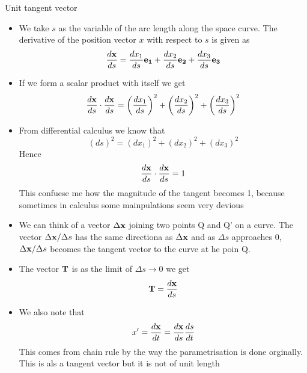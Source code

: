 	\begin{frame}{Unit tangent vector}
		\begin{itemize}
			\item We take $s$ as the variable of the arc length along the space curve. The derivative of the position vector $x$ with respect to $s$ is given as
			\begin{equation}
				\frac{d\mathbf{x}}{ds} = \frac{dx_1}{ds}\mathbf{e_1} +\frac{dx_2}{ds}\mathbf{e_2}+\frac{dx_3}{ds}\mathbf{e_3}
			\end{equation}
			\item If we form a scalar product with itself we get
			\begin{equation}
				\frac{d \mathbf{x}}{ds} \cdot \frac{d \mathbf{x}}{ds} = 
				\left(\frac{dx_1}{ds} \right)^2 + \left(\frac{dx_2}{ds} \right)^2 + \left(\frac{dx_3}{ds} \right)^2
			\end{equation}
			\item From differential calculus we know that
			\begin{equation}
				\left(ds \right)^2 = \left(dx_1 \right)^2 + \left(dx_2 \right)^2 + \left(dx_3 \right)^2
			\end{equation}
			Hence
			\begin{equation}
				\frac{d \mathbf{x}}{ds} \cdot \frac{d \mathbf{x}}{ds} =  1
			\end{equation}
			This confuese me how the magnitude of the tangent becomes 1, because sometimes in calculus some mainpulations seem very devious
		\end{itemize}
	\end{frame}


	\begin{frame}
		\begin{itemize}
			\item We can think of a vector $\Delta\mathbf{ x}$ joining two points Q and Q' on a curve. The vector $\Delta\mathbf{ x}/\Delta s$ has the same directiona as $\Delta\mathbf{ x}$ and as $\Delta s$ approaches 0, $\Delta\mathbf{ x}/\Delta s$ becomes the tangent vector to the curve at he poin Q. 
			\item The vector $\mathbf{T}$ is as the limit of $\Delta s \rightarrow 0$ we get 
			\begin{equation}
				\mathbf{T} = \frac{d \mathbf{x}}{ds} 
			\end{equation}
			\item We also note that 
			\begin{equation}
				{{x}'} = \frac{d\mathbf{x}}{dt} = \frac{d\mathbf{x}}{ds}\frac{ds}{dt} 
			\end{equation}
			This comes from chain rule by the way the parametrisation is done orginally. This is als a tangent vector but it is not of unit length
		\end{itemize}
	\end{frame}


